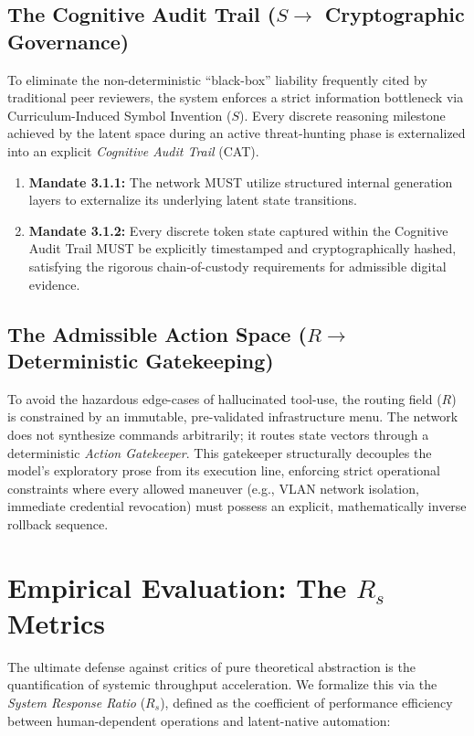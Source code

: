 \subsection{The Cognitive Audit Trail ($S \to$ Cryptographic Governance)}
To eliminate the non-deterministic ``black-box'' liability frequently cited by traditional peer reviewers, the system enforces a strict information bottleneck via Curriculum-Induced Symbol Invention ($S$). Every discrete reasoning milestone achieved by the latent space during an active threat-hunting phase is externalized into an explicit \textit{Cognitive Audit Trail} (CAT). 
\begin{enumerate}
    \item \textbf{Mandate 3.1.1:} The network MUST utilize structured internal generation layers to externalize its underlying latent state transitions.
    \item \textbf{Mandate 3.1.2:} Every discrete token state captured within the Cognitive Audit Trail MUST be explicitly timestamped and cryptographically hashed, satisfying the rigorous chain-of-custody requirements for admissible digital evidence.
\end{enumerate}

\subsection{The Admissible Action Space ($R \to$ Deterministic Gatekeeping)}
To avoid the hazardous edge-cases of hallucinated tool-use, the routing field ($R$) is constrained by an immutable, pre-validated infrastructure menu. The network does not synthesize commands arbitrarily; it routes state vectors through a deterministic \textit{Action Gatekeeper}. This gatekeeper structurally decouples the model's exploratory prose from its execution line, enforcing strict operational constraints where every allowed maneuver (e.g., VLAN network isolation, immediate credential revocation) must possess an explicit, mathematically inverse rollback sequence.

\section{Empirical Evaluation: The $R_s$ Metrics}
The ultimate defense against critics of pure theoretical abstraction is the quantification of systemic throughput acceleration. We formalize this via the \textit{System Response Ratio} ($R_s$), defined as the coefficient of performance efficiency between human-dependent operations and latent-native automation:

